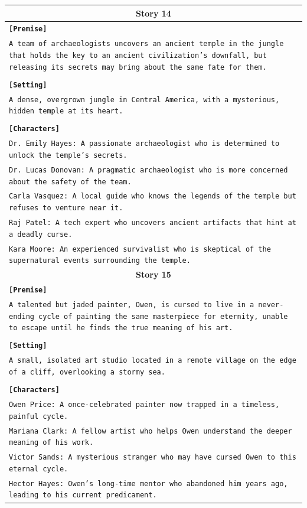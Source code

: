 \documentclass[letterpaper]{article} %
\begin{document}
\begin{small}
\begin{longtable}{p{\textwidth}}
    \multicolumn{1}{c}{\textbf{Story 14}} \\
    \midrule
    \texttt{\textbf{[Premise]}} \\
    \texttt{A team of archaeologists uncovers an ancient temple in the jungle that holds the key to an ancient civilization's downfall, but releasing its secrets may bring about the same fate for them.} \\\\
    \texttt{\textbf{[Setting]}} \\
    \texttt{A dense, overgrown jungle in Central America, with a mysterious, hidden temple at its heart.} \\\\
    \texttt{\textbf{[Characters]}} \\
    \texttt{Dr. Emily Hayes: A passionate archaeologist who is determined to unlock the temple's secrets.} \\
    \texttt{Dr. Lucas Donovan: A pragmatic archaeologist who is more concerned about the safety of the team.} \\
    \texttt{Carla Vasquez: A local guide who knows the legends of the temple but refuses to venture near it.} \\
    \texttt{Raj Patel: A tech expert who uncovers ancient artifacts that hint at a deadly curse.} \\
    \texttt{Kara Moore: An experienced survivalist who is skeptical of the supernatural events surrounding the temple.} \\
    \midrule
  
    \multicolumn{1}{c}{\textbf{Story 15}} \\
    \midrule
    \texttt{\textbf{[Premise]}} \\
    \texttt{A talented but jaded painter, Owen, is cursed to live in a never-ending cycle of painting the same masterpiece for eternity, unable to escape until he finds the true meaning of his art.} \\\\
    \texttt{\textbf{[Setting]}} \\
    \texttt{A small, isolated art studio located in a remote village on the edge of a cliff, overlooking a stormy sea.} \\\\
    \texttt{\textbf{[Characters]}} \\
    \texttt{Owen Price: A once-celebrated painter now trapped in a timeless, painful cycle.} \\
    \texttt{Mariana Clark: A fellow artist who helps Owen understand the deeper meaning of his work.} \\
    \texttt{Victor Sands: A mysterious stranger who may have cursed Owen to this eternal cycle.} \\
    \texttt{Hector Hayes: Owen's long-time mentor who abandoned him years ago, leading to his current predicament.} \\
    \midrule
  

\end{longtable}
\end{small}
\end{document}
